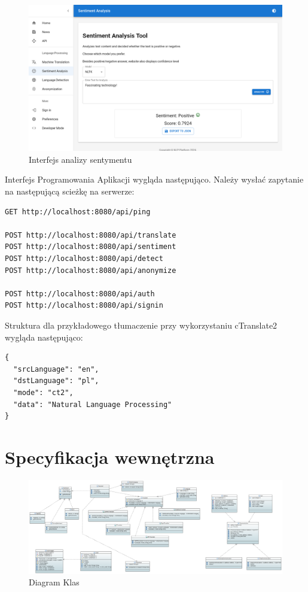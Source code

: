 \documentclass{article}
\begin{document}
\begin{figure}[h!]
\centering
  \includegraphics[width=1\linewidth]{img/nlp-sentiment.png}
  \caption{\label{fig:nlp sentiment}Interfejs analizy sentymentu}
\end{figure}

Interfejs Programowania Aplikacji wygląda następująco. Należy wysłać zapytanie na następującą scieżkę na serwerze:

\begin{lstlisting}
GET http://localhost:8080/api/ping

POST http://localhost:8080/api/translate
POST http://localhost:8080/api/sentiment
POST http://localhost:8080/api/detect
POST http://localhost:8080/api/anonymize

POST http://localhost:8080/api/auth
POST http://localhost:8080/api/signin
\end{lstlisting}

\noindent Struktura dla przykładowego tłumaczenie przy wykorzystaniu cTranslate2 wygląda następująco:

\begin{lstlisting}
{
  "srcLanguage": "en",
  "dstLanguage": "pl",
  "mode": "ct2",
  "data": "Natural Language Processing"
}
\end{lstlisting}

\section{Specyfikacja wewnętrzna}

\begin{figure}[h!]
\centering
  \includegraphics[width=1\linewidth]{img/Class_Diagram.PNG}
  \caption{\label{fig:class diagram}Diagram Klas}
\end{figure}
\end{document}
